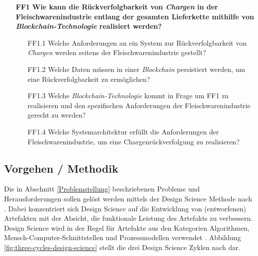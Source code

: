 \begin{itemize}
  \item[\textbf{FF1}] \textbf{Wie kann die Rückverfolgbarkeit von \textit{Chargen} in der Fleischwarenindustrie entlang der gesamten Lieferkette mithilfe von \textit{Blockchain-Technologie} realisiert werden?}
  \begin{itemize}
    \item[FF1.1] Welche Anforderungen an ein System zur Rückverfolgbarkeit von \textit{Chargen} werden seitens der Fleischwarenindustrie gestellt?
    \item[FF1.2] Welche Daten müssen in einer \textit{Blockchain} persistiert werden, um eine Rückverfolgbarkeit zu ermöglichen?
    \item[FF1.3] Welche \textit{Blockchain-Technologie} kommt in Frage um FF1 zu realisieren und den spezifischen Anforderungen der Fleischwarenindustrie gerecht zu werden?
    \item[FF1.4] Welche Systemarchitektur erfüllt die Anforderungen der Fleischwarenindustrie, um eine Chargenrückverfolgung zu realisieren?
  \end{itemize}
\end{itemize}

\subsection{Vorgehen / Methodik}

Die in Abschnitt \ref{Problemstellung} beschriebenen Probleme und Herausforderungen sollen gelöst werden mittels der Design Science Methode nach \citet{Hevner2004, Hevner2007}. Dabei konzentriert sich Design Science auf die Entwicklung von (entworfenen) Artefakten mit der Absicht, die funktionale Leistung des Artefakts zu verbessern. Design Science wird in der Regel für Artefakte aus den Kategorien Algorithmen, Mensch-Computer-Schnittstellen und Prozessmodellen verwendet \citep{Peffers2012, Kuechler2008}. Abbildung \ref{fig:three-cycles-design-science} stellt die drei Design Science Zyklen nach \citet{Hevner2010} dar.

